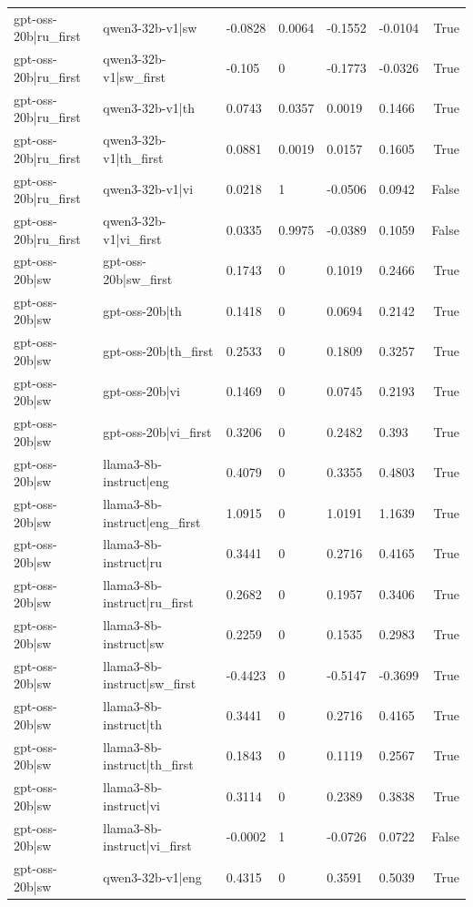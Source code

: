 \begin{table}
\begin{tabular}{llllllr}
gpt-oss-20b|ru_first & qwen3-32b-v1|sw & -0.0828 & 0.0064 & -0.1552 & -0.0104 & True \\
gpt-oss-20b|ru_first & qwen3-32b-v1|sw_first & -0.105 & 0 & -0.1773 & -0.0326 & True \\
gpt-oss-20b|ru_first & qwen3-32b-v1|th & 0.0743 & 0.0357 & 0.0019 & 0.1466 & True \\
gpt-oss-20b|ru_first & qwen3-32b-v1|th_first & 0.0881 & 0.0019 & 0.0157 & 0.1605 & True \\
gpt-oss-20b|ru_first & qwen3-32b-v1|vi & 0.0218 & 1 & -0.0506 & 0.0942 & False \\
gpt-oss-20b|ru_first & qwen3-32b-v1|vi_first & 0.0335 & 0.9975 & -0.0389 & 0.1059 & False \\
gpt-oss-20b|sw & gpt-oss-20b|sw_first & 0.1743 & 0 & 0.1019 & 0.2466 & True \\
gpt-oss-20b|sw & gpt-oss-20b|th & 0.1418 & 0 & 0.0694 & 0.2142 & True \\
gpt-oss-20b|sw & gpt-oss-20b|th_first & 0.2533 & 0 & 0.1809 & 0.3257 & True \\
gpt-oss-20b|sw & gpt-oss-20b|vi & 0.1469 & 0 & 0.0745 & 0.2193 & True \\
gpt-oss-20b|sw & gpt-oss-20b|vi_first & 0.3206 & 0 & 0.2482 & 0.393 & True \\
gpt-oss-20b|sw & llama3-8b-instruct|eng & 0.4079 & 0 & 0.3355 & 0.4803 & True \\
gpt-oss-20b|sw & llama3-8b-instruct|eng_first & 1.0915 & 0 & 1.0191 & 1.1639 & True \\
gpt-oss-20b|sw & llama3-8b-instruct|ru & 0.3441 & 0 & 0.2716 & 0.4165 & True \\
gpt-oss-20b|sw & llama3-8b-instruct|ru_first & 0.2682 & 0 & 0.1957 & 0.3406 & True \\
gpt-oss-20b|sw & llama3-8b-instruct|sw & 0.2259 & 0 & 0.1535 & 0.2983 & True \\
gpt-oss-20b|sw & llama3-8b-instruct|sw_first & -0.4423 & 0 & -0.5147 & -0.3699 & True \\
gpt-oss-20b|sw & llama3-8b-instruct|th & 0.3441 & 0 & 0.2716 & 0.4165 & True \\
gpt-oss-20b|sw & llama3-8b-instruct|th_first & 0.1843 & 0 & 0.1119 & 0.2567 & True \\
gpt-oss-20b|sw & llama3-8b-instruct|vi & 0.3114 & 0 & 0.2389 & 0.3838 & True \\
gpt-oss-20b|sw & llama3-8b-instruct|vi_first & -0.0002 & 1 & -0.0726 & 0.0722 & False \\
gpt-oss-20b|sw & qwen3-32b-v1|eng & 0.4315 & 0 & 0.3591 & 0.5039 & True \\

\end{tabular}
\end{table}
